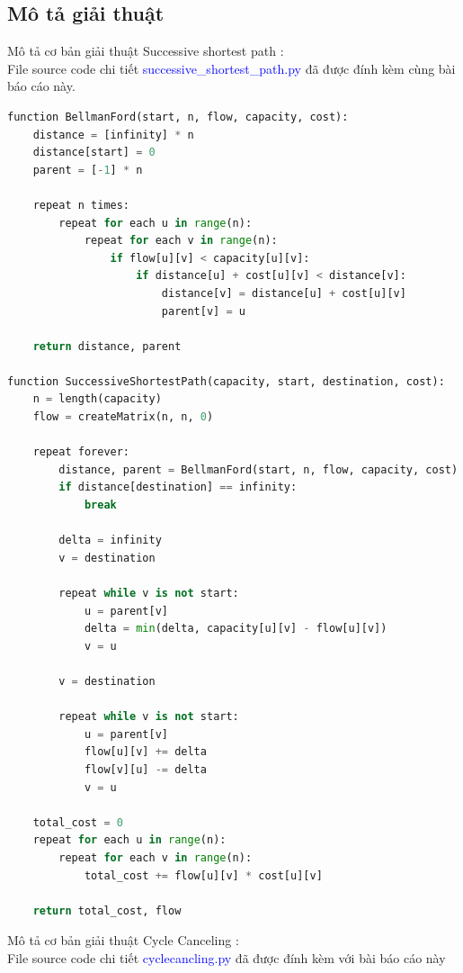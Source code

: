 \documentclass[a4paper]{article}
\begin{document}
 \subsection{Mô tả giải thuật}
 Mô tả cơ bản giải thuật Successive shortest path :\\
 File source code chi tiết \textcolor{blue}{successive\_shortest\_path.py} đã được đính kèm cùng bài báo cáo này. 
\begin{lstlisting}[language=Python, caption={}, label={lst:pythoncode}]
function BellmanFord(start, n, flow, capacity, cost):
    distance = [infinity] * n
    distance[start] = 0
    parent = [-1] * n

    repeat n times:
        repeat for each u in range(n):
            repeat for each v in range(n):
                if flow[u][v] < capacity[u][v]:
                    if distance[u] + cost[u][v] < distance[v]:
                        distance[v] = distance[u] + cost[u][v]
                        parent[v] = u

    return distance, parent

function SuccessiveShortestPath(capacity, start, destination, cost):
    n = length(capacity)
    flow = createMatrix(n, n, 0)

    repeat forever:
        distance, parent = BellmanFord(start, n, flow, capacity, cost)
        if distance[destination] == infinity:
            break

        delta = infinity
        v = destination
        
        repeat while v is not start:
            u = parent[v]
            delta = min(delta, capacity[u][v] - flow[u][v])
            v = u

        v = destination

        repeat while v is not start:
            u = parent[v]
            flow[u][v] += delta
            flow[v][u] -= delta
            v = u

    total_cost = 0
    repeat for each u in range(n):
        repeat for each v in range(n):
            total_cost += flow[u][v] * cost[u][v]

    return total_cost, flow

\end{lstlisting}
 Mô tả cơ bản giải thuật Cycle Canceling :\\
 File source code chi tiết \textcolor{blue}{cyclecancling.py} đã được đính kèm với bài báo cáo này
\end{document}
